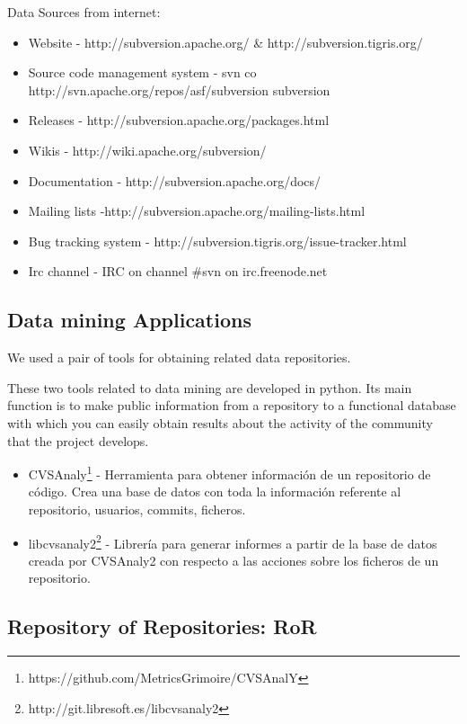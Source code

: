 \documentclass[11pt]{scrartcl}
\begin{document}
Data Sources from internet:

\begin{itemize}
    \item Website - http://subversion.apache.org/ \& http://subversion.tigris.org/
    \item Source code management system - svn co http://svn.apache.org/repos/asf/subversion subversion
    \item Releases - http://subversion.apache.org/packages.html
    \item Wikis - http://wiki.apache.org/subversion/
    \item Documentation - http://subversion.apache.org/docs/
    \item Mailing lists -http://subversion.apache.org/mailing-lists.html
    \item Bug tracking system - http://subversion.tigris.org/issue-tracker.html
    \item Irc channel - IRC on channel \#svn on irc.freenode.net
\end{itemize}

\subsection{Data mining Applications}

We used a pair of tools for obtaining related data repositories.

\par These two tools related to data mining are developed in python. Its main function is to make public information from a repository to a functional database with which you can easily obtain results about the activity of the community that the project develops.

\begin{itemize}
    \item CVSAnaly\footnote{https://github.com/MetricsGrimoire/CVSAnalY} - Herramienta para obtener información de un repositorio de código. Crea una base de datos con toda la información referente al repositorio, usuarios, commits, ficheros.
    \item libcvsanaly2\footnote{http://git.libresoft.es/libcvsanaly2} - Librería para generar informes a partir de la base de datos creada por CVSAnaly2 con respecto a las acciones sobre los ficheros de un repositorio.
\end{itemize}

\subsection{Repository of Repositories: RoR}
\end{document}
